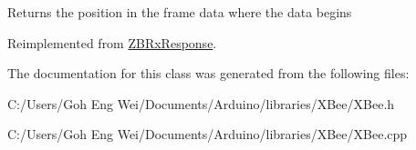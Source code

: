 Returns the position in the frame data where the data begins 

Reimplemented from \hyperlink{class_z_b_rx_response_ad54e6ff3008f79d0ed32a78cc3d69151}{Z\+B\+Rx\+Response}.



The documentation for this class was generated from the following files\+:\begin{DoxyCompactItemize}
\item 
C\+:/\+Users/\+Goh Eng Wei/\+Documents/\+Arduino/libraries/\+X\+Bee/X\+Bee.\+h\item 
C\+:/\+Users/\+Goh Eng Wei/\+Documents/\+Arduino/libraries/\+X\+Bee/X\+Bee.\+cpp\end{DoxyCompactItemize}
